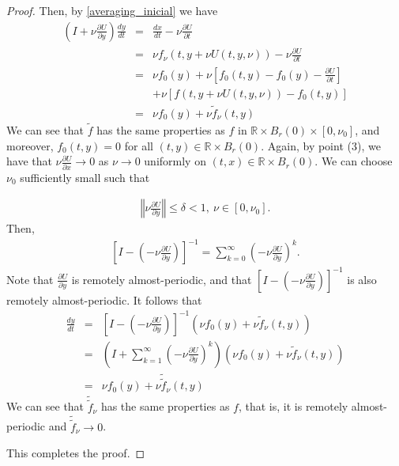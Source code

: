 \documentclass[10pt,a4paper]{amsart}
\begin{document}
\begin{proof}
Then, by \eqref{averaging_inicial} we have
\begin{eqnarray*}
\left(I+\nu \frac{\partial U}{\partial y}\right)\frac{dy}{dt}
&=&\frac{dx}{dt}-\nu\frac{\partial U}{\partial t}\\
&=& \nu f_{\nu}(t,y+\nu U(t,y,\nu))-\nu \frac{\partial U}{\partial t}\\
&=& \nu f_{0}(y)+ \nu \left[ f_{0}(t,y)-f_0(y)- \frac{\partial U}{\partial t}\right]\\
& & +\nu \left[ f(t,y+\nu U(t,y,\nu))-f_{0}(t,y)\right]\\
&=& \nu f_0(y)+\nu \tilde{f}_{\nu}(t,y)
\end{eqnarray*}
We can see that $\tilde{f}$ has the same properties as $f$ in $\mathbb{R}\times B_{r}(0)\times[0,\nu_0]$, and moreover, $f_0(t,y)=0$ for all $(t,y)\in\mathbb{R}\times B_{r}(0)$.  
Again, by point (3), we have that $\nu \frac{\partial U}{\partial x}\rightarrow 0$ as $\nu\rightarrow 0$ uniformly on $(t,x)\in \mathbb{R}\times B_{r}(0)$.  
We can choose $\nu_0$ sufficiently small such that

\begin{eqnarray*}
\left\Vert \nu \frac{\partial U}{\partial y}\right\Vert\leq \delta <1,\ \nu\in[0,\nu_0].
\end{eqnarray*}
Then,
\begin{eqnarray*}
\left[I-\left(-\nu \frac{\partial U}{\partial y} \right) \right]^{-1}=\sum_{k=0}^{\infty}\left( -\nu \frac{\partial U}{\partial y}  \right)^k.
\end{eqnarray*}
Note that $\frac{\partial U}{\partial y}$ is remotely almost-periodic, and that $[I - (-\nu \frac{\partial U}{\partial y})]^{-1}$ is also remotely almost-periodic.  
It follows that
\begin{eqnarray*}
\frac{dy}{dt}
&=& \left[I-\left(-\nu \frac{\partial U}{\partial y} \right) \right]^{-1} (\nu f_0(y)+\nu \tilde{f}_{\nu}(t,y))\\
&=& \left(I+\sum_{k=1}^{\infty}\left( -\nu \frac{\partial U}{\partial y}  \right)^k \right)(\nu f_0(y)+\nu \tilde{f}_{\nu}(t,y))\\
&=&\nu f_0(y)+\nu \tilde{\tilde{f}}_{\nu}(t,y)
\end{eqnarray*}
We can see that $\tilde{\tilde{f}}_\nu$ has the same properties as $f$, that is, it is remotely almost-periodic and $\tilde{\tilde{f}}_\nu \rightarrow 0$.

This completes the proof.
\end{proof}
\end{document}
